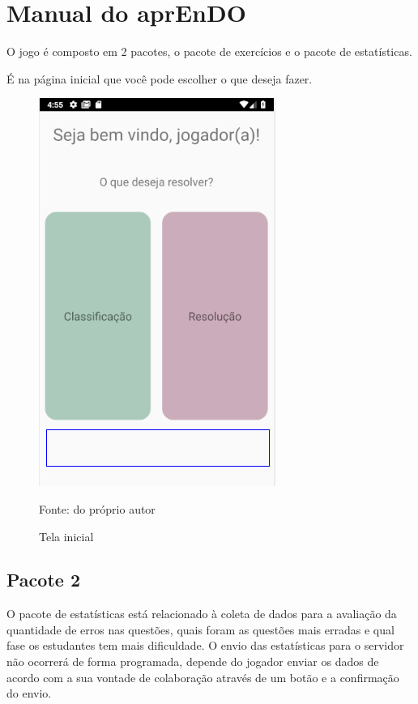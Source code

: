 \chapter[Manual do aprEnDO]{Manual do aprEnDO}
O jogo é composto em 2 pacotes, o pacote de exercícios e o pacote de estatísticas.

É na página inicial que você pode escolher o que deseja fazer.

\begin{figure}[H]
\centering
\caption{Tela inicial}
\includegraphics[scale=0.72]{figuras/tela_inicial.png}

\small{Fonte: do próprio autor}
\end{figure}



\section[Pacote 2]{Pacote 2}
O pacote de estatísticas está relacionado à coleta de dados para a avaliação da quantidade de erros nas questões, quais foram as questões mais erradas e qual fase os estudantes tem mais dificuldade. O envio das estatísticas para o servidor não ocorrerá de forma programada, depende do jogador enviar os dados de acordo com a sua vontade de colaboração através de um botão e a confirmação do envio.


